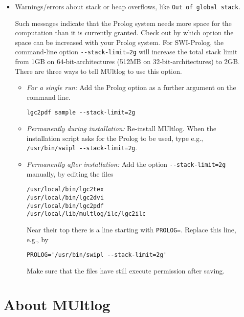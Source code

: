 \documentclass[]{article}
\newcommand{\passthrough}[1]{#1}
\begin{document}
\begin{itemize}
\item
  Warnings/errors about stack or heap overflows, like
  \passthrough{\lstinline!Out of global stack!}.

  Such messages indicate that the Prolog system needs more space for the
  computation than it is currently granted. Check out by which option
  the space can be increased with your Prolog system. For SWI-Prolog,
  the command-line option \passthrough{\lstinline!--stack-limit=2g!}
  will increase the total stack limit from 1GB on 64-bit-architectures
  (512MB on 32-bit-architectures) to 2GB. There are three ways to tell
  MUltlog to use this option.

  \begin{itemize}
  \item
    \emph{For a single run:} Add the Prolog option as a further argument
    on the command line.

\begin{lstlisting}
lgc2pdf sample --stack-limit=2g
\end{lstlisting}
  \item
    \emph{Permanently during installation:} Re-install MUltlog. When the
    installation script asks for the Prolog to be used, type e.g.,
    \passthrough{\lstinline!/usr/bin/swipl --stack-limit=2g!}.
  \item
    \emph{Permanently after installation:} Add the option
    \passthrough{\lstinline!--stack-limit=2g!} manually, by editing the
    files

\begin{lstlisting}
/usr/local/bin/lgc2tex
/usr/local/bin/lgc2dvi
/usr/local/bin/lgc2pdf
/usr/local/lib/multlog/ilc/lgc2ilc
\end{lstlisting}

    Near their top there is a line starting with
    \passthrough{\lstinline!PROLOG=!}. Replace this line, e.g., by

\begin{lstlisting}
PROLOG='/usr/bin/swipl --stack-limit=2g'
\end{lstlisting}

    Make sure that the files have still execute permission after saving.
  \end{itemize}
\end{itemize}

\hypertarget{about-multlog}{%
\section{About MUltlog}\label{about-multlog}}
\end{document}
